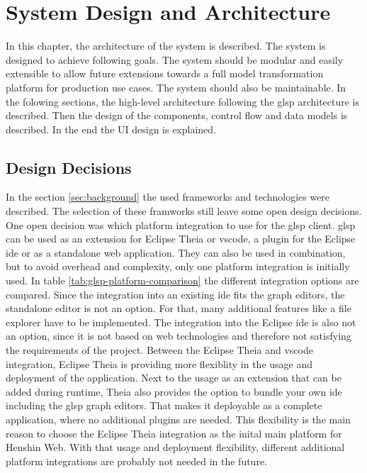  \chapter{System Design and Architecture}
  \label{sec:system-design}

  In this chapter, the architecture of the system is described. The system is designed to achieve following goals. The system should be modular and easily extensible to allow future extensions towards a full model transformation platform for production use cases. The system should also be maintainable. In the folowing sections, the high-level architecture following the \ac{glsp} architecture is described. Then the design of the components, control flow and data models is described. In the end the UI design is explained.

 \section{Design Decisions}
  \label{subsec:design-decisions}

  In the section \ref{sec:background} the used frameworks and technologies were described. The selection of these framworks still leave some open design decisions. One open decision was which platform integration to use for the \ac{glsp} client. \ac{glsp} can be used as an extension for Eclipse Theia or \ac{vscode}, a plugin for the Eclipse \acs{ide} or as a standalone web application. They can also be used in combination, but to avoid overhead and complexity, only one platform integration is initially used. In table \ref{tab:glsp-platform-comparison} the different integration options are compared. Since the integration into an existing \acs{ide} fits the graph editors, the standalone editor is not an option. For that, many additional features like a file explorer have to be implemented. The integration into the Eclipse \acs{ide} is also not an option, since it is not based on web technologies and therefore not satisfying the requirements of the project. Between the Eclipse Theia and \ac{vscode} integration, Eclipse Theia is providing more flexiblity in the usage and deployment of the application. Next to the usage as an extension that can be added during runtime, Theia also provides the option to bundle your own \ac{ide} including the \ac{glsp} graph editors. That makes it deployable as a complete application, where no additional plugins are needed. This flexibility is the main reason to choose the Eclipse Theia integration as the inital main platform for Henshin Web. With that usage and deployment flexibility, different additional platform integrations are probably not needed in the future.

